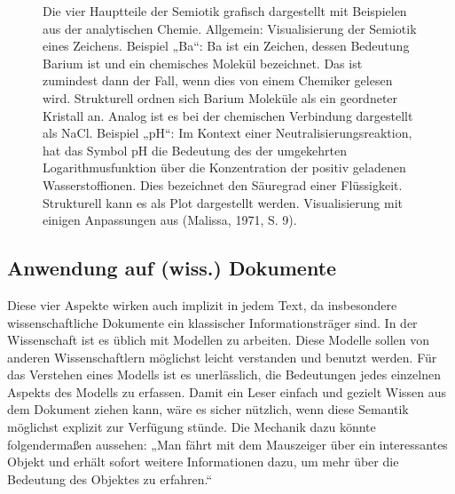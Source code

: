  
\begin{figure}[h!]
\centering
\advance\leftskip-2.5cm
\caption[Semiotik grafisch dargestellt]{ Die vier Hauptteile der Semiotik grafisch dargestellt mit Beispielen aus der analytischen Chemie. Allgemein: Visualisierung der Semiotik eines Zeichens. Beispiel „Ba“: Ba ist ein Zeichen, dessen Bedeutung Barium ist und ein chemisches Molekül bezeichnet. Das ist zumindest dann der Fall, wenn dies von einem Chemiker gelesen wird. Strukturell ordnen sich Barium Moleküle als ein geordneter Kristall an. Analog ist es bei der chemischen Verbindung dargestellt als NaCl. Beispiel „pH“: Im Kontext einer Neutralisierungsreaktion, hat das Symbol pH die Bedeutung des der umgekehrten Logarithmusfunktion über die Konzentration der positiv geladenen Wasserstoffionen. Dies bezeichnet den Säuregrad einer Flüssigkeit. Strukturell kann es als Plot dargestellt werden. Visualisierung mit einigen Anpassungen aus (Malissa, 1971, S. 9). }\label{semiotik}
\end{figure}
 
\subsection{Anwendung auf (wiss.) Dokumente}\label{}
 
Diese vier Aspekte wirken auch implizit in jedem Text, da insbesondere wissenschaftliche Dokumente ein klassischer Informationsträger sind. In der Wissenschaft ist es üblich mit Modellen zu arbeiten. Diese Modelle sollen von anderen Wissenschaftlern möglichst leicht verstanden und benutzt werden. Für das Verstehen eines Modells ist es unerlässlich, die Bedeutungen jedes einzelnen Aspekts des Modells zu erfassen. Damit ein Leser einfach und gezielt Wissen aus dem Dokument ziehen kann, wäre es sicher nützlich, wenn diese Semantik möglichst explizit zur Verfügung stünde. Die Mechanik dazu könnte folgendermaßen aussehen: „Man fährt mit dem Mauszeiger über ein interessantes Objekt und erhält sofort weitere Informationen dazu, um mehr über die Bedeutung des Objektes zu erfahren.“

